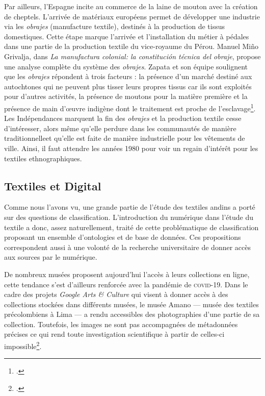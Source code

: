 \documentclass[a4paper, twoside, 12pt]{book}
\begin{document}
Par ailleurs, l'Espagne incite au commerce de la laine de mouton avec la création de cheptels. 
L'arrivée de matériaux européens permet de développer une industrie via les \textit{obrajes} (manufacture textile), destinés à la production de tissus domestiques. 
Cette étape marque l'arrivée et l'installation du métier à pédales dans une partie de la production textile du vice-royaume du Pérou. 
Manuel Miño Grivalja, dans \textit{La manufactura colonial: la constitución técnica del obraje}, propose une analyse complète du système des \textit{obrajes}. Zapata et son équipe soulignent que les \textit{obrajes} répondent à trois facteurs : la présence d'un marché destiné aux autochtones qui ne peuvent plus tisser leurs propres tissus car ils sont exploités pour d'autres activités, la présence de moutons pour la matière première et la présence de main d'\oe{}uvre indigène dont le traitement est proche de l'esclavage\footcite{zapatavelascoHistoriaCulturaAyacucho2008}. 
Les Indépendances marquent la fin des \textit{obrajes} et la production textile cesse d'intéresser, alors même qu'elle perdure dans les communautés de manière \og traditionnelle\fg \:et qu'elle est faite de manière industrielle pour les vêtements de ville. Ainsi, il faut attendre les années 1980 pour voir un regain d'intérêt pour les textiles ethnographiques.

\subsection*{Textiles et Digital}

Comme nous l'avons vu, une grande partie de l'étude des textiles andins a porté sur des questions de classification. L'introduction du numérique dans l'étude du textile a donc, assez naturellement, traité de cette problématique de classification proposant un ensemble d'ontologies et de base de données. Ces propositions correspondent aussi à une volonté de la recherche universitaire de donner accès aux sources par le numérique.

De nombreux musées proposent aujourd'hui l'accès à leurs collections en ligne, cette tendance s'est d'ailleurs renforcée avec la pandémie de \textsc{covid-}\small 19\normalsize. Dans le cadre des projets \textit{Google Arts \& Culture} qui visent à donner accès à des collections stockées dans différents musées, le musée Amano --- musée des textiles précolombiens à Lima --- a rendu accessibles des photographies d'une partie de sa collection. Toutefois, les images ne sont pas accompagnées de métadonnées précises ce qui rend toute investigation scientifique à partir de celles-ci impossible\footcite{AMANO}. 
\end{document}
